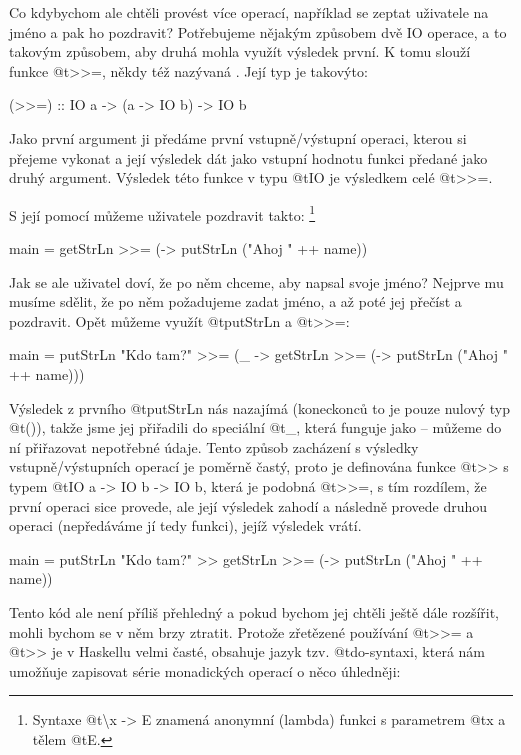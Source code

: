 Co kdybychom ale chtěli provést více operací, například se zeptat uživatele na
jméno a pak ho pozdravit? Potřebujeme nějakým způsobem  dvě IO
operace, a to takovým způsobem, aby druhá mohla využít výsledek první. K tomu
slouží funkce @t{>>=}, někdy též nazývaná . Její typ je takovýto:

\begin{haskell}
(>>=) :: IO a -> (a -> IO b) -> IO b
\end{haskell}

Jako první argument ji předáme první vstupně/výstupní operaci, kterou si přejeme
vykonat a její výsledek dát jako vstupní hodnotu funkci předané jako druhý
argument. Výsledek této funkce  v typu @t{IO} je výsledkem celé
@t{>>=}.

S její pomocí můžeme uživatele pozdravit takto: \footnote{Syntaxe
@t{\textbackslash x -> E} znamená anonymní (lambda) funkci s parametrem @t{x} a
tělem @t{E}.}

\begin{haskell}
main = getStrLn >>= (\name -> putStrLn ("Ahoj " ++ name))
\end{haskell}
  
Jak se ale uživatel doví, že po něm chceme, aby napsal svoje jméno? Nejprve mu
musíme sdělit, že po něm požadujeme zadat jméno, a až poté jej přečíst a
pozdravit. Opět můžeme využít @t{putStrLn} a @t{>>=}:

\begin{haskell}
main = 
  putStrLn "Kdo tam?" >>= (\_ ->
    getStrLn >>= (\name ->
      putStrLn ("Ahoj " ++ name)))
\end{haskell}

Výsledek z prvního @t{putStrLn} nás nazajímá (koneckonců to je pouze nulový typ
@t{()}), takže jsme jej přiřadili do speciální  @t{_}, která
funguje jako  -- můžeme do ní přiřazovat nepotřebné údaje. Tento
způsob zacházení s výsledky vstupně/výstupních operací je poměrně častý, proto
je definována funkce @t{>>} s typem @t{IO a -> IO b -> IO b}, která je podobná
@t{>>=}, s tím rozdílem, že první operaci sice provede, ale její výsledek zahodí
a následně provede druhou operaci (nepředáváme jí tedy funkci), jejíž výsledek
vrátí.

\begin{haskell}
main = 
  putStrLn "Kdo tam?" >>
    getStrLn >>= (\name ->
      putStrLn ("Ahoj " ++ name))
\end{haskell}

Tento kód ale není příliš přehledný a pokud bychom jej chtěli ještě dále
rozšířit, mohli bychom se v něm brzy ztratit. Protože zřetězené používání
@t{>>=} a @t{>>} je v Haskellu velmi časté, obsahuje jazyk tzv. @t{do}-syntaxi,
která nám umožňuje zapisovat série monadických operací o něco úhledněji:


